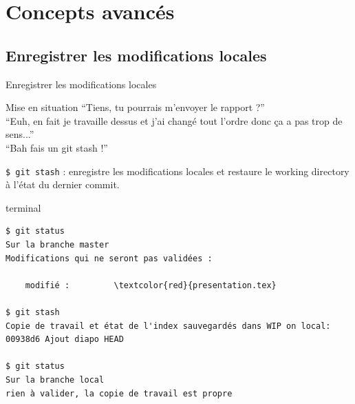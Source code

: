 \documentclass[usepdftitle=false]{beamer}
\begin{document}
\section{Concepts avancés}

\subsection{Enregistrer les modifications locales}

\begin{frame}[fragile]{Enregistrer les modifications locales}
	\begin{block}{Mise en situation}
		\enquote{Tiens, tu pourrais m'envoyer le rapport ?} \\
		\enquote{Euh, en fait je travaille dessus et j'ai changé tout l'ordre donc ça a pas trop de sens...} \\
		\enquote{Bah fais un git stash !}
	\end{block}

	\verb+$ git stash+ : enregistre les modifications locales et restaure le working directory à l'état du dernier commit.

	\begin{beamercolorbox}[rounded=true,shadow=true]{terminal}
	\begin{Verbatim}
$ git status
Sur la branche master
Modifications qui ne seront pas validées :

	modifié :         \textcolor{red}{presentation.tex}

$ git stash
Copie de travail et état de l'index sauvegardés dans WIP on local: 00938d6 Ajout diapo HEAD

$ git status
Sur la branche local
rien à valider, la copie de travail est propre
\end{Verbatim}
	\end{beamercolorbox}
\end{frame}
\end{document}
